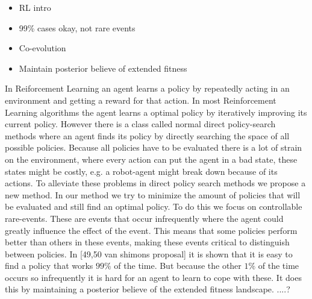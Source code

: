 
\begin{itemize}
  \item{RL intro}
  \item{99\% cases okay, not rare events}
  \item{Co-evolution}
  \item{Maintain posterior believe of extended fitness}
\end{itemize}

In Reiforcement Learning an agent learns a policy by repeatedly acting in an environment and getting a reward for that action. In most Reinforcement Learning algorithms the agent learns a optimal policy by iteratively improving its current policy. However there is a class called normal direct policy-search methods where an agent finds its policy by directly searching the space of all possible policies. Because all policies have to be evaluated there is a lot of strain on the environment, where every action can put the agent in a bad state, these states might be costly, e.g. a robot-agent might break down because of its actions. To alleviate these problems in direct policy search methods we propose a new method. In our method we try to minimize the amount of policies that will be evaluated and still find an optimal policy. To do this we focus on controllable rare-events. These are events that occur infrequently where the agent could greatly influence the effect of the event. This means that some policies perform better than others in these events, making these events critical to distinguish between policies. In [49,50 van shimons proposal] it is shown that it is easy to find a policy that works $99\%$ of the time. But because the other $1\%$ of the time occurs so infrequently it is hard for an agent to learn to cope with these. It does this by maintaining a posterior believe of the extended fitness landscape. ....?